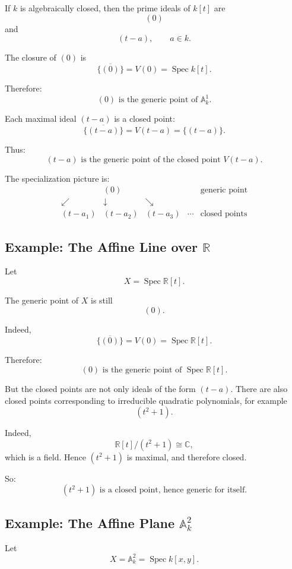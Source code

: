 \documentclass[12pt,a4paper]{article}
\theoremstyle{notespace}
\begin{document}
If \(k\) is algebraically closed, then the prime ideals of \(k[t]\) are
\[
(0)
\]
and
\[
(t-a),\qquad a\in k.
\]

The closure of \((0)\) is
\[
\overline{\{(0)\}}=V(0)=\operatorname{Spec} k[t].
\]

Therefore:
\[
\boxed{
	(0)\text{ is the generic point of }\mathbb A^1_k.
}
\]

Each maximal ideal \((t-a)\) is a closed point:
\[
\overline{\{(t-a)\}}=V(t-a)=\{(t-a)\}.
\]

Thus:
\[
\boxed{
	(t-a)\text{ is the generic point of the closed point }V(t-a).
}
\]

The specialization picture is:
\[
\begin{array}{ccccc}
	& (0) & & & \text{generic point}
	\\[0.6em]
	\swarrow & \downarrow & \searrow
	\\[0.6em]
	(t-a_1) & (t-a_2) & (t-a_3) & \cdots & \text{closed points}
\end{array}
\]

\subsection{Example: The Affine Line over \(\mathbb R\)}

Let
\[
X=\operatorname{Spec}\mathbb R[t].
\]

The generic point of \(X\) is still
\[
(0).
\]

Indeed,
\[
\overline{\{(0)\}}=V(0)=\operatorname{Spec}\mathbb R[t].
\]

Therefore:
\[
\boxed{
	(0)\text{ is the generic point of }\operatorname{Spec}\mathbb R[t].
}
\]

But the closed points are not only ideals of the form \((t-a)\). There are also closed points corresponding to irreducible quadratic polynomials, for example
\[
(t^2+1).
\]

Indeed,
\[
\mathbb R[t]/(t^2+1)\cong \mathbb C,
\]
which is a field. Hence \((t^2+1)\) is maximal, and therefore closed.

So:
\[
\boxed{
	(t^2+1)\text{ is a closed point, hence generic for itself.}
}
\]

\subsection{Example: The Affine Plane \(\mathbb A^2_k\)}

Let
\[
X=\mathbb A^2_k=\operatorname{Spec} k[x,y].
\]
\end{document}
